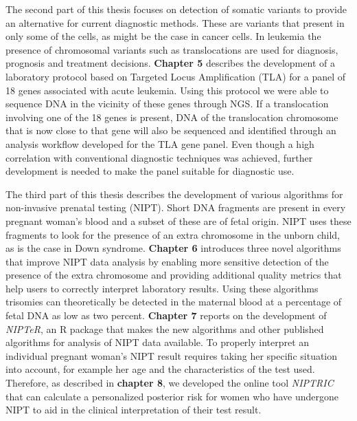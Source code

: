 \begin{appendices}
	The second part of this thesis focuses on detection of somatic variants to provide an alternative for current diagnostic methods. These are variants that present in only some of the cells, as might be the case in cancer cells. In leukemia the presence of chromosomal variants such as translocations are used for diagnosis, prognosis and treatment decisions. \textbf{Chapter 5} describes the development of a laboratory protocol based on Targeted Locus Amplification (TLA) for a panel of 18 genes associated with acute leukemia. Using this protocol we were able to sequence DNA in the vicinity of these genes through NGS. If a translocation involving one of the 18 genes is present, DNA of the translocation chromosome that is now close to that gene will also be sequenced and identified through an analysis workflow developed for the TLA gene panel. Even though a high correlation with conventional diagnostic techniques was achieved, further development is needed to make the panel suitable for diagnostic use.
	
	The third part of this thesis describes the development of various algorithms for non-invasive prenatal testing (NIPT). Short DNA fragments are present in every pregnant woman’s blood and a subset of these are of fetal origin. NIPT uses these fragments to look for the presence of an extra chromosome in the unborn child, as is the case in Down syndrome. \textbf{Chapter 6} introduces three novel algorithms that improve NIPT data analysis by enabling more sensitive detection of the presence of the extra chromosome and providing additional quality metrics that help users to correctly interpret laboratory results. Using these algorithms trisomies can theoretically be detected in the maternal blood at a percentage of fetal DNA as low as two percent. \textbf{Chapter 7} reports on the development of \textsl{NIPTeR}, an R package that makes the new algorithms and other published algorithms for analysis of NIPT data available. To properly interpret an individual pregnant woman’s NIPT result requires taking her specific situation into account, for example her age and the characteristics of the test used. Therefore, as described in \textbf{chapter 8}, we developed the online tool \textsl{NIPTRIC} that can calculate a personalized posterior risk for women who have undergone NIPT to aid in the clinical interpretation of their test result.
	

\end{appendices}
